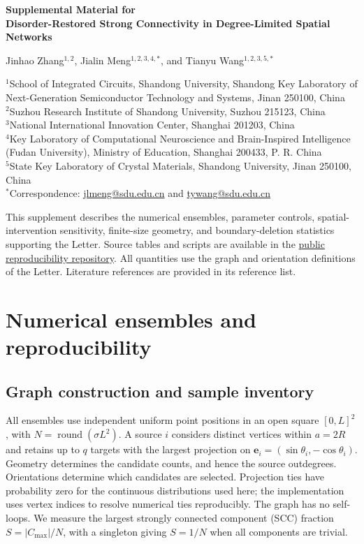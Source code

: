 \documentclass[11pt]{article}
\begin{document}
\begin{center}
{\Large\bfseries Supplemental Material for\\[3pt]
Disorder-Restored Strong Connectivity in Degree-Limited Spatial Networks}\par
\vspace{8pt}
Jinhao Zhang$^{1,2}$, Jialin Meng$^{1,2,3,4,*}$, and Tianyu Wang$^{1,2,3,5,*}$\par
\vspace{6pt}
{\small
$^1$School of Integrated Circuits, Shandong University, Shandong Key Laboratory of Next-Generation Semiconductor Technology and Systems, Jinan 250100, China\\
$^2$Suzhou Research Institute of Shandong University, Suzhou 215123, China\\
$^3$National International Innovation Center, Shanghai 201203, China\\
$^4$Key Laboratory of Computational Neuroscience and Brain-Inspired Intelligence (Fudan University), Ministry of Education, Shanghai 200433, P. R. China\\
$^5$State Key Laboratory of Crystal Materials, Shandong University, Jinan 250100, China\\[4pt]
$^*$Correspondence: \href{mailto:jlmeng@sdu.edu.cn}{jlmeng@sdu.edu.cn} and \href{mailto:tywang@sdu.edu.cn}{tywang@sdu.edu.cn}}
\end{center}
This supplement describes the numerical ensembles, parameter controls, spatial-intervention sensitivity, finite-size geometry, and boundary-deletion statistics supporting the Letter. Source tables and scripts are available in the \href{https://github.com/neuromorphicscience-sys/janus-disorder-connectivity}{public reproducibility repository}. All quantities use the graph and orientation definitions of the Letter. Literature references are provided in its reference list.
\section{Numerical ensembles and reproducibility}
\subsection{Graph construction and sample inventory}
All ensembles use independent uniform point positions in an open square $[0,L]^2$, with $N=\operatorname{round}(\sigma L^2)$. A source $i$ considers distinct vertices within $a=2R$ and retains up to $q$ targets with the largest projection on $\bm e_i=(\sin\theta_i,-\cos\theta_i)$. Geometry determines the candidate counts, and hence the source outdegrees. Orientations determine which candidates are selected. Projection ties have probability zero for the continuous distributions used here; the implementation uses vertex indices to resolve numerical ties reproducibly. The graph has no self-loops. We measure the largest strongly connected component (SCC) fraction $S=|C_{\max}|/N$, with a singleton giving $S=1/N$ when all components are trivial.
\end{document}
